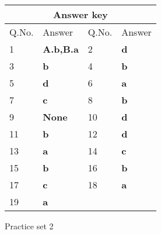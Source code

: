 \setlength\arrayrulewidth{1pt}
\begin{table}[H]
	\centering
	
	\begin{tabular}{|p{1.5cm}|p{1.5cm}||p{1.5cm}|p{1.5cm}|}
		\hline
		\multicolumn{4}{|c|}{\textbf{Answer key}}\\\hline\hline
		\rowcolor{ocrel}Q.No.&Answer&Q.No.&Answer\\\hline
		1&\textbf{A.b,B.a}&2&\textbf{d}\\\hline
		3&\textbf{b}&4&\textbf{b}\\\hline
		5&\textbf{d}&6&\textbf{a}\\\hline
		7&\textbf{c}&8&\textbf{b}\\\hline
		9&\textbf{None}&10&\textbf{d}\\\hline
		11&\textbf{b}&12&\textbf{d}\\\hline
		13&\textbf{a}&14&\textbf{c}\\\hline
		15&\textbf{b}&16&\textbf{b}\\\hline
		17&\textbf{c}&18&\textbf{a}\\\hline
		19&\textbf{a}&&\\\hline
	\end{tabular}
\end{table}
\newpage
\begin{abox}
	Practice set 2
	\end{abox}
